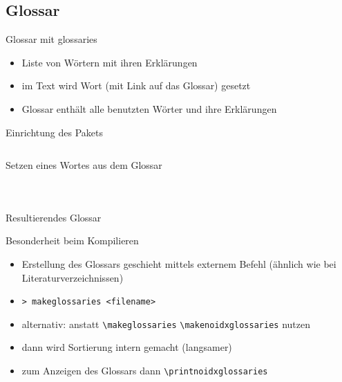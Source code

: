 \documentclass[presentation,aspectratio=169]{beamer}
\begin{document}
\subsection{Glossar}

\begin{frame}{Glossar mit glossaries}
  \begin{itemize}
    \item Liste von Wörtern mit ihren Erklärungen
    \item im Text wird Wort (mit Link auf das Glossar) gesetzt
    \item Glossar enthält alle benutzten Wörter und ihre Erklärungen
  \end{itemize}
\end{frame}

\begin{frame}[fragile]{Einrichtung des Pakets}
  \inputminted{latex}{codebeispiele/glossaries-setup.tex}
\end{frame}

\begin{frame}[fragile]{Setzen eines Wortes aus dem Glossar}
  \begin{columns}
    \begin{column}{.49\textwidth}
      
    \end{column}
    \begin{column}{.5\textwidth}
      \inputminted{latex}{codebeispiele/glossaries-usage.tex}
    \end{column}
  \end{columns}
\end{frame}

\begin{frame}{Resultierendes Glossar}
  \printglossary
\end{frame}

\begin{frame}[fragile]{Besonderheit beim Kompilieren}
  \begin{itemize}
    \item Erstellung des Glossars geschieht mittels externem Befehl (ähnlich wie bei Literaturverzeichnissen)
    \item \verb|> makeglossaries <filename>|
    \vspace{1em}
    \item alternativ: anstatt \verb|\makeglossaries| \verb|\makenoidxglossaries| nutzen
    \item dann wird Sortierung intern gemacht (langsamer)
    \item zum Anzeigen des Glossars dann \verb|\printnoidxglossaries|
  \end{itemize}
\end{frame}
\end{document}
